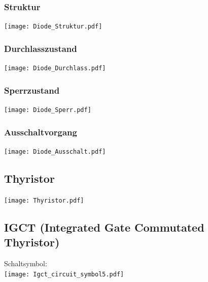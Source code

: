 \documentclass[german]{latex4ei_fs}
\begin{document}
\begin{sectionbox}
\subsubsection*{Struktur}
\texttt{[image: Diode\_Struktur.pdf]}
\end{sectionbox}
\begin{sectionbox}
\subsubsection*{Durchlasszustand}
\texttt{[image: Diode\_Durchlass.pdf]}
\end{sectionbox}
\begin{sectionbox}

\subsubsection*{Sperrzustand}
\texttt{[image: Diode\_Sperr.pdf]}

\end{sectionbox}
\begin{sectionbox}
\subsubsection*{Ausschaltvorgang}
\texttt{[image: Diode\_Ausschalt.pdf]}

\end{sectionbox}
\begin{sectionbox}
\subsection{Thyristor}
\texttt{[image: Thyristor.pdf]}

\end{sectionbox}

\begin{sectionbox}
\subsection{IGCT (Integrated Gate Commutated Thyristor)}
Schaltsymbol: \\
\texttt{[image: Igct\_circuit\_symbol5.pdf]}

\end{sectionbox}
\end{document}
